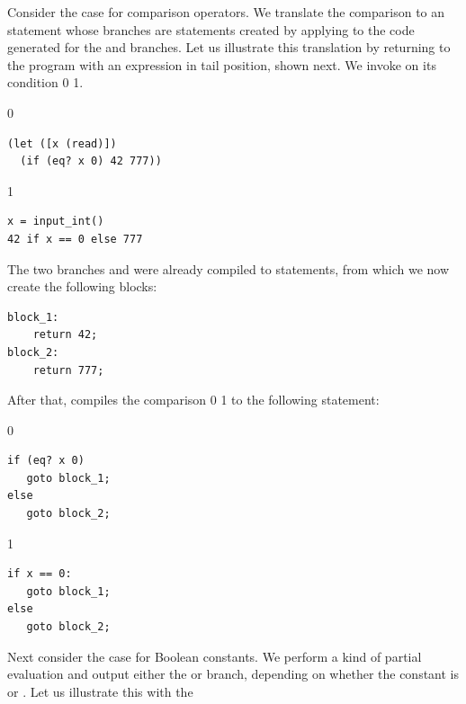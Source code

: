 \documentclass[7x10]{TimesAPriori_MIT}%
\def\racketEd{0}
\def\pythonEd{1}
\def\edition{0}
\newcommand{\racket}[1]{{\if\edition\racketEd{#1}\fi}}
\newcommand{\python}[1]{{\if\edition\pythonEd #1\fi}}
\numberwithin{theorem}{chapter}
\numberwithin{definition}{chapter}
\numberwithin{equation}{chapter}
\begin{document}
Consider the case for comparison operators. We translate the
comparison to an  statement whose branches are 
statements created by applying  to the code
generated for the  and  branches. Let us
illustrate this translation by returning to the program with an
 expression in tail position, shown next. We invoke
 on its condition \racket{}
\python{}.
%
{\if\edition\racketEd
\begin{lstlisting}
(let ([x (read)])
  (if (eq? x 0) 42 777))
\end{lstlisting}
\fi}
%
{\if\edition\pythonEd
\begin{lstlisting}
x = input_int()
42 if x == 0 else 777
\end{lstlisting}
\fi}
%
\noindent The two branches  and  were already
compiled to  statements, from which we now create the
following blocks:
%
\begin{center}
\begin{minipage}{\textwidth}
\begin{lstlisting}
block_1:
    return 42;
block_2:
    return 777;
\end{lstlisting}
  \end{minipage}
\end{center}
%
After that,  compiles the comparison
\racket{}
\python{}
to the following  statement:
%
{\if\edition\racketEd
\begin{center}
\begin{minipage}{\textwidth}
\begin{lstlisting}
if (eq? x 0)
   goto block_1;
else
   goto block_2;
\end{lstlisting}
\end{minipage}
\end{center}
\fi}
{\if\edition\pythonEd
\begin{center}
\begin{minipage}{\textwidth}
\begin{lstlisting}
if x == 0:
   goto block_1;
else
   goto block_2;
\end{lstlisting}
\end{minipage}
\end{center}
\fi}
Next consider the case for Boolean constants. We perform a kind of
partial evaluation and output
either the  or  branch, depending on whether the
constant is \TRUE{} or \FALSE{}. Let us illustrate this with the
\end{document}
